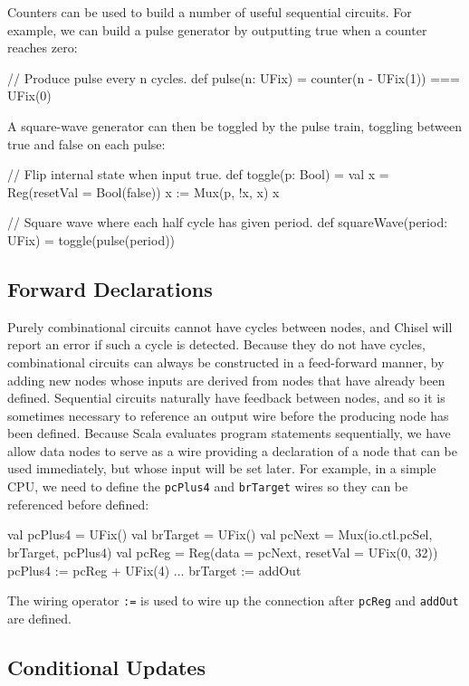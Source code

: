 \documentclass[twocolumn,10pt]{article}
\begin{document}
Counters can be used to build a number of useful sequential circuits.
For example, we can build a pulse generator by outputting true when
a counter reaches zero:
\begin{scala}
// Produce pulse every n cycles.
def pulse(n: UFix) = counter(n - UFix(1)) === UFix(0)
\end{scala}

\noindent
A square-wave generator can then be toggled by the pulse train,
toggling between true and false on each pulse:
\begin{scala}
// Flip internal state when input true.
def toggle(p: Bool) = {
  val x = Reg(resetVal = Bool(false))
  x := Mux(p, !x, x)
  x
}

// Square wave where each half cycle has given period.
def squareWave(period: UFix) = toggle(pulse(period))
\end{scala}

\subsection{Forward Declarations}

Purely combinational circuits cannot have cycles between nodes, and
Chisel will report an error if such a cycle is detected.  Because they
do not have cycles, combinational circuits can always be constructed
in a feed-forward manner, by adding new nodes whose inputs are derived
from nodes that have already been defined.  Sequential circuits
naturally have feedback between nodes, and so it is sometimes
necessary to reference an output wire before the producing node has
been defined.  Because Scala evaluates program statements
sequentially, we have allow data nodes to serve as a wire providing
a declaration of a node that can be used immediately, but whose
input will be set later.  
For example, in a simple CPU, we need to define the \verb!pcPlus4!
and \verb!brTarget! wires so they can be referenced before defined:
\begin{scala}
val pcPlus4  = UFix()
val brTarget = UFix()
val pcNext   = Mux(io.ctl.pcSel, brTarget, pcPlus4)
val pcReg    = Reg(data = pcNext, resetVal = UFix(0, 32))
pcPlus4     := pcReg + UFix(4)
...
brTarget    := addOut
\end{scala}

\noindent
The wiring operator
\verb!:=! is used to wire up
the connection after \verb!pcReg! and \verb!addOut! are defined.

\subsection{Conditional Updates}
\end{document}
